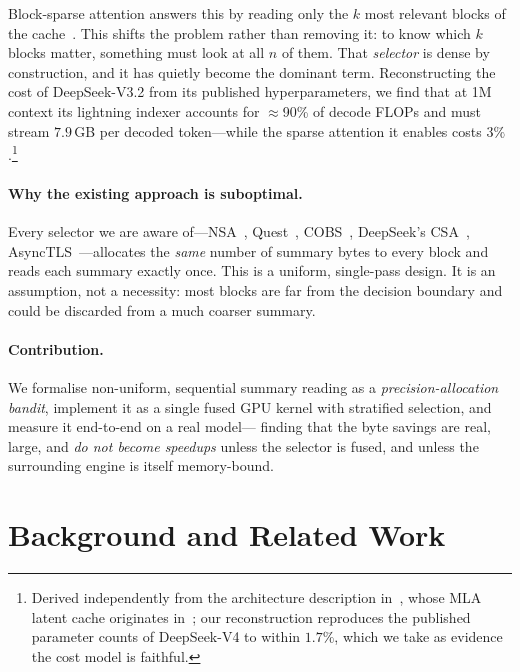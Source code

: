 \documentclass[sigconf,nonacm,11pt]{acmart}
\begin{document}
Block-sparse attention answers this by reading only the $k$ most relevant blocks
of the cache~\cite{yuan2025nsa,tang2024quest}. This shifts the problem rather
than removing it: to know which $k$ blocks matter, something must look at all
$n$ of them. That \emph{selector} is dense by construction, and it has quietly
become the dominant term. Reconstructing the cost of DeepSeek-V3.2 from its
published hyperparameters, we find that at 1M context its lightning indexer
accounts for $\approx$90\% of decode FLOPs and must stream $7.9$\,GB per decoded
token---while the sparse attention it enables costs $3\%$.\footnote{Derived
independently from the architecture description
in~\cite{deepseek2025v32,deepseek2024v3}, whose MLA latent cache originates
in~\cite{deepseek2024v2}; our reconstruction reproduces the
published parameter counts of DeepSeek-V4 to within $1.7\%$, which we take as
evidence the cost model is faithful.}

\paragraph{Why the existing approach is suboptimal.} Every selector we are aware
of---NSA~\cite{yuan2025nsa}, Quest~\cite{tang2024quest},
COBS~\cite{tian2026cobs}, DeepSeek's CSA~\cite{deepseek2026v4},
AsyncTLS~\cite{hu2026asynctls}---allocates the \emph{same} number of summary
bytes to every block and reads each summary exactly once. This is a uniform,
single-pass design. It is an assumption, not a necessity: most blocks are far
from the decision boundary and could be discarded from a much coarser summary.

\paragraph{Contribution.} We formalise non-uniform, sequential summary reading
as a \emph{precision-allocation bandit}, implement it as a single fused GPU
kernel with stratified selection, and measure it end-to-end on a real model---%
finding that the byte savings are real, large, and \emph{do not become
speedups} unless the selector is fused, and unless the surrounding engine is
itself memory-bound.

\section{Background and Related Work}
\end{document}
